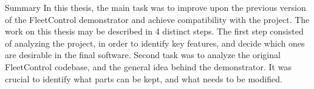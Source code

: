 \chap Summary
In this thesis, the main task was to improve upon the previous version of the FleetControl demonstrator and achieve compatibility with the {\mapfIR} project. 
The work on this thesis may be described in 4 distinct steps.\br
The first step consisted of analyzing the {\mapfIR} project, in order to identify key features, and decide which ones are desirable in the final software.
\br
Second task was to analyze the original FleetControl codebase, and the general idea behind the demonstrator. It was crucial to identify what parts can be kept, and what needs to be modified.
\br
 